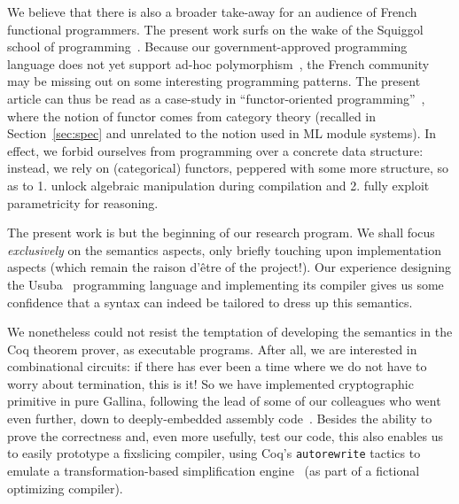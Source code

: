 \documentclass[draft,english]{jflart}
\begin{document}

We believe that there is also a broader take-away for an audience of
French functional programmers. The present work surfs on
the wake of the Squiggol school of programming~\citep{bird:squiggol}.
Because our government-approved programming language does not yet
support ad-hoc polymorphism~\citep{white:modular-implicit}, the French
community may be missing out on some interesting programming patterns.
The present article can thus be read as a case-study in
``functor-oriented programming''~\citep{roconnor:functor-oriented},
where the notion of functor comes from category theory (recalled in
Section~\ref{sec:spec} and unrelated to the notion used in ML module
systems). In effect, we forbid ourselves from programming over a
concrete data structure: instead, we rely on (categorical) functors,
peppered with some more structure, so as to 1. unlock algebraic
manipulation during compilation and 2. fully exploit parametricity for
reasoning.


The present work is but the beginning of our research program. We
shall focus \emph{exclusively} on the semantics aspects, only briefly
touching upon implementation aspects (which remain the raison d'être
of the project!). Our experience designing the Usuba~\citep{mercadier:PhD}
programming language and implementing its compiler gives us some
confidence that a syntax can indeed be tailored to dress up this
semantics.

We nonetheless could not resist the temptation of developing the
semantics in the Coq theorem prover, as executable programs. After
all, we are interested in combinational circuits: if there has ever
been a time where we do not have to worry about termination, this is
it! So we have implemented cryptographic primitive in pure Gallina,
following the lead of some of our colleagues who went even further,
down to deeply-embedded assembly code~\citep{chlipala:coq-crypto}.
Besides the ability to prove the correctness and, even more usefully,
test our code, this also enables us to easily prototype a fixslicing
compiler, using Coq's \texttt{autorewrite} tactics to emulate a
transformation-based simplification
engine~\citep{peyton-jones:haskell-optim} (as part of a fictional
optimizing compiler).
\end{document}
